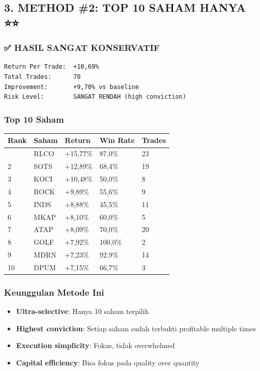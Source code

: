 \documentclass[
  10pt,
  a4paper,
]{article}
\providecommand{\tightlist}{%
  \setlength{\itemsep}{0pt}\setlength{\parskip}{0pt}}\usepackage{longtable,booktabs,array}
\begin{document}
\subsection{3. METHOD \#2: TOP 10 SAHAM HANYA
⭐⭐}\label{method-2-top-10-saham-hanya}

\subsubsection{✅ HASIL SANGAT
KONSERVATIF}\label{hasil-sangat-konservatif}

\begin{verbatim}
Return Per Trade:  +10,69%
Total Trades:      70
Improvement:       +9,70% vs baseline
Risk Level:        SANGAT RENDAH (high conviction)
\end{verbatim}

\subsubsection{Top 10 Saham}\label{top-10-saham}

\begin{longtable}[]{@{}lllll@{}}
\toprule\noalign{}
Rank & Saham & Return & Win Rate & Trades \\
\midrule\noalign{}
\endhead
\bottomrule\noalign{}
\endlastfoot
1 & RLCO & +15,77\% & 87,0\% & 23 \\
2 & SOTS & +12,89\% & 68,4\% & 19 \\
3 & KOCI & +10,48\% & 50,0\% & 8 \\
4 & ROCK & +9,89\% & 55,6\% & 9 \\
5 & INDS & +8,88\% & 45,5\% & 11 \\
6 & MKAP & +8,10\% & 60,0\% & 5 \\
7 & ATAP & +8,09\% & 70,0\% & 20 \\
8 & GOLF & +7,92\% & 100,0\% & 2 \\
9 & MDRN & +7,23\% & 92,9\% & 14 \\
10 & DPUM & +7,15\% & 66,7\% & 3 \\
\end{longtable}

\subsubsection{Keunggulan Metode Ini}\label{keunggulan-metode-ini}

\begin{itemize}
\tightlist
\item
  \textbf{Ultra-selective}: Hanya 10 saham terpilih
\item
  \textbf{Highest conviction}: Setiap saham sudah terbukti profitable
  multiple times
\item
  \textbf{Execution simplicity}: Fokus, tidak overwhelmed
\item
  \textbf{Capital efficiency}: Bisa fokus pada quality over quantity
\end{itemize}
\end{document}
